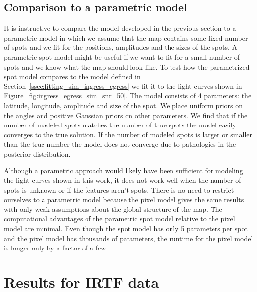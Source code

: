 \documentclass[modern]{aastex62}
\begin{document}
\subsection{Comparison to a parametric model}
It is instructive to compare the model developed in the previous section to a parametric model in which we assume that the map contains some fixed number of spots and we fit for the positions, amplitudes and the sizes of the spots.
A parametric spot model might be useful if we want to fit for a small number of spots and we know what the map should look like.
To test how the parametrized spot model compares to the model defined in Section~\ref{ssec:fitting_sim_ingress_egress} we fit it to the light curves shown in Figure~\ref{fig:ingress_egress_sim_snr_50}. 
The model consists of 4 parameters: the latitude, longitude, amplitude and size of the spot.
We place uniform priors on the angles and positive Gaussian priors on other parameters. 
We find that if the number of modeled spots matches the number of true spots the model easily converges to the true solution. 
If the number of modeled spots is larger or smaller than the true number the model does not converge due to pathologies in the posterior distribution.

Although a parametric approach would likely have been sufficient for modeling the light curves shown in this work, it does not work well when the number of spots is unknown or if the features aren't spots.
There is no need to restrict ourselves to a parametric model because the pixel model gives the same results with only weak assumptions about the global structure of the map. 
The computational advantages of the parametric spot model relative to the pixel model are minimal. 
Even though the spot model has only 5 parameters per spot and the pixel model has thousands of parameters, the runtime for the pixel model is longer only by a factor of a few. 

\section{Results for IRTF data}
\label{sec:results}
\end{document}
